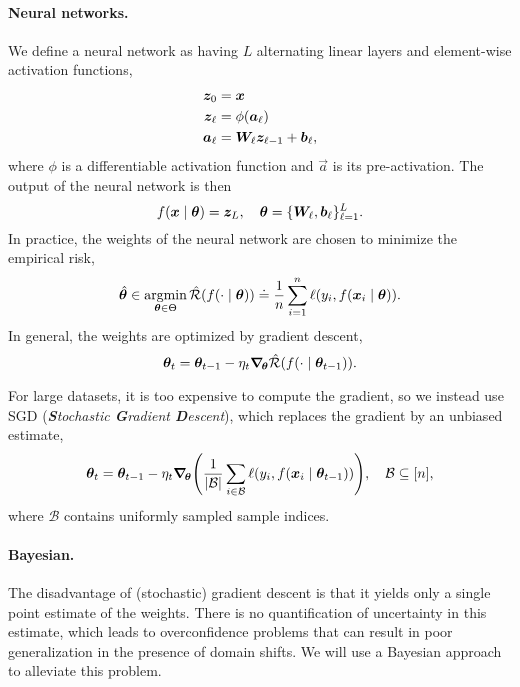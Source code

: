 \paragraph{Neural networks.}

We define a neural network as having $L$ alternating linear layers and element-wise activation
functions,
\begin{align*}
    \bm{z}_0      & = \bm{x}                                       \\
    \bm{z}_\ell   & = \phi(\bm{a}_\ell)                            \\
    \bm{a}_{\ell} & = \bm{W}_\ell \bm{z}_{\ell-1} + \bm{b}_\ell,
\end{align*}
where $\phi$ is a differentiable activation function and $\vec{a}$ is its pre-activation. The output of the neural network is then \[
    f(\bm{x} \mid \bm{\theta}) = \bm{z}_L, \quad \bm{\theta} = \{ \bm{W}_{\ell}, \bm{b}_{\ell} \}_{\ell=1}^L.
\]
In practice, the weights of the neural network are chosen to minimize the empirical risk, \[
    \hat{\bm{\theta}} \in \operatorname*{argmin}_{\bm{\theta} \in \Theta} \hat{\mathcal{R}}(f(\cdot \mid \bm{\theta})) \doteq \frac{1}{n} \sum_{i=1}^{n} \ell(y_i, f(\bm{x}_i \mid \bm{\theta})).
\]
In general, the weights are optimized by gradient descent, \[
    \bm{\theta}_t = \bm{\theta}_{t-1} - \eta_t \bm{\nabla}_{\! \bm{\theta}} \hat{\mathcal{R}}(f(\cdot \mid \bm{\theta}_{t-1})).
\]


For large datasets, it is too expensive to compute the gradient, so we instead use SGD
(\textit{\textbf{S}tochastic \textbf{G}radient \textbf{D}escent}), which replaces the gradient by
an unbiased estimate, \[
    \vec{\theta}_t = \vec{\theta}_{t-1} - \eta_t \grad{\lft( \frac{1}{|\mathcal{B}|} \sum_{i \in \mathcal{B}} \ell(y_i, f(\vec{x}_i \mid \vec{\theta}_{t-1})) \rgt)}{\vec{\theta}}, \quad \mathcal{B} \subseteq [n],
\]
where $\mathcal{B}$ contains uniformly sampled sample indices.

\paragraph{Bayesian.}

The disadvantage of (stochastic) gradient descent is that it yields only a single point estimate of
the weights. There is no quantification of uncertainty in this estimate, which leads to
overconfidence problems that can result in poor generalization in the presence of domain shifts. We
will use a Bayesian approach to alleviate this problem.

